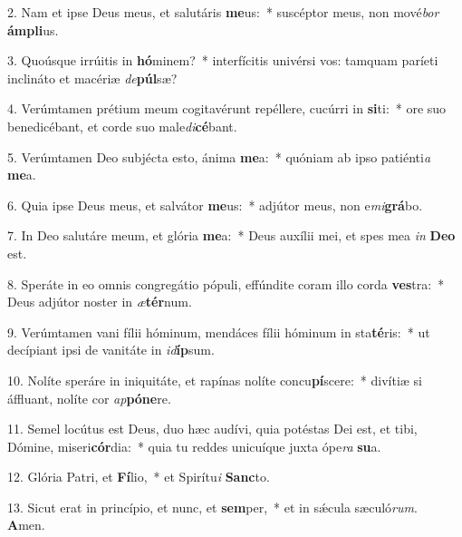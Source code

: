 2. Nam et ipse Deus meus, et salutáris \textbf{me}us:~*  suscéptor meus, non mové\textit{bor} \textbf{ám}\textbf{pli}us.\

3. Quoúsque irrúitis in \textbf{hó}minem?~*  interfícitis univérsi vos: tamquam paríeti inclináto et macériæ \textit{de}\textbf{púl}sæ?\

4. Verúmtamen prétium meum cogitavérunt repéllere, cucúrri in \textbf{si}ti:~*  ore suo benedicébant, et corde suo male\textit{di}\textbf{cé}bant.\

5. Verúmtamen Deo subjécta esto, ánima \textbf{me}a:~*  quóniam ab ipso patiénti\textit{a} \textbf{me}a.\

6. Quia ipse Deus meus, et salvátor \textbf{me}us:~*  adjútor meus, non e\textit{mi}\textbf{grá}bo.\

7. In Deo salutáre meum, et glória \textbf{me}a:~*  Deus auxílii mei, et spes mea \textit{in} \textbf{De}\textbf{o} est.\

8. Speráte in eo omnis congregátio pópuli, effúndite coram illo corda \textbf{ves}tra:~*  Deus adjútor noster in \textit{æ}\textbf{tér}num.\

9. Verúmtamen vani fílii hóminum, mendáces fílii hóminum in sta\textbf{té}ris:~*  ut decípiant ipsi de vanitáte in \textit{id}\textbf{íp}sum.\

10. Nolíte speráre in iniquitáte, et rapínas nolíte concu\textbf{pí}scere:~*  divítiæ si áffluant, nolíte cor \textit{ap}\textbf{pó}\textbf{ne}re.\

11. Semel locútus est Deus, duo hæc audívi, quia potéstas Dei est, et tibi, Dómine, miseri\textbf{cór}dia:~*  quia tu reddes unicuíque juxta ópe\textit{ra} \textbf{su}a.\

12. Glória Patri, et \textbf{Fí}lio,~*  et Spirítu\textit{i} \textbf{Sanc}to.\

13. Sicut erat in princípio, et nunc, et \textbf{sem}per,~*  et in sǽcula sæculó\textit{rum}. \textbf{A}men.\

